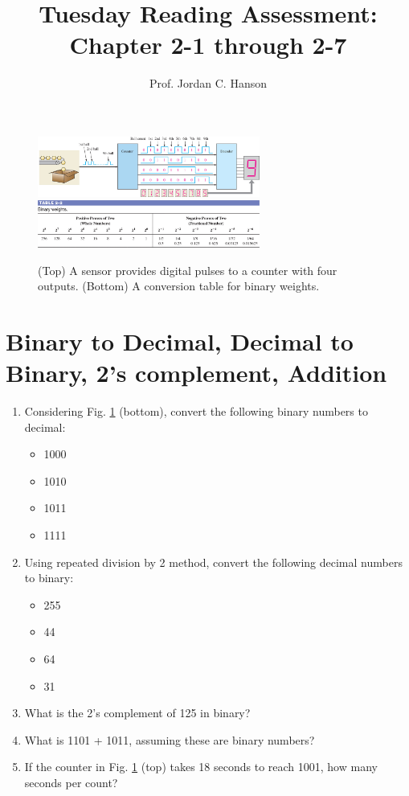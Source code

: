 \documentclass{article}
\begin{document}
\title{Tuesday Reading Assessment: Chapter 2-1 through 2-7}
\author{Prof. Jordan C. Hanson}

\maketitle

\begin{figure}[ht]
\centering
\includegraphics[width=0.65\textwidth]{figures/counter_balls.jpg} \\ \vspace{0.25cm}
\includegraphics[width=0.65\textwidth]{figures/binary_weights.jpg}
\caption{\label{fig:quiz} (Top) A sensor provides digital pulses to a counter with four outputs. (Bottom) A conversion table for binary weights.}
\end{figure}

\section{Binary to Decimal, Decimal to Binary, 2's complement, Addition}

\begin{enumerate}
\item Considering Fig. \ref{fig:quiz} (bottom), convert the following binary numbers to decimal:
\begin{itemize}
\item 1000
\item 1010
\item 1011
\item 1111
\end{itemize}
\item Using repeated division by 2 method, convert the following decimal numbers to binary:
\begin{itemize}
\item 255
\item 44
\item 64
\item 31
\end{itemize}
\item What is the 2's complement of 125 in binary? \\ \vspace{0.5cm}
\item What is 1101 + 1011, assuming these are binary numbers? \\ \vspace{0.5cm}
\item If the counter in Fig. \ref{fig:quiz} (top) takes 18 seconds to reach 1001, how many seconds per count?
\end{enumerate}
\end{document}
